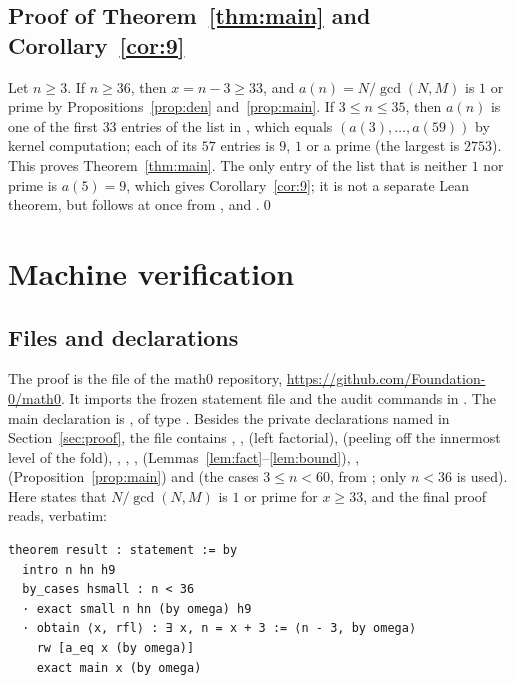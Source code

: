 \documentclass[11pt]{amsart}
\theoremstyle{plain}
\theoremstyle{definition}
\begin{document}
\subsection{Proof of Theorem~\ref{thm:main} and Corollary~\ref{cor:9}}
Let $n\ge3$. If $n\ge36$, then $x=n-3\ge33$, and $a(n)=N/\gcd(N,M)$ is $1$ or prime by Propositions~\ref{prop:den} and~\ref{prop:main}. If $3\le n\le35$, then $a(n)$ is one of the first $33$ entries of the list in , which equals $(a(3),\dots,a(59))$ by kernel computation; each of its $57$ entries is $9$, $1$ or a prime (the largest is $2753$). This proves Theorem~\ref{thm:main}. The only entry of the list that is neither $1$ nor prime is $a(5)=9$, which gives Corollary~\ref{cor:9}; it is not a separate Lean theorem, but follows at once from ,  and .\qed

\section{Machine verification}\label{sec:lean}

\subsection*{Files and declarations}
The proof is the file  of the math0 repository, \url{https://github.com/Foundation-0/math0}. It imports the frozen statement file and the audit commands in . The main declaration is , of type . Besides the private declarations named in Section~\ref{sec:proof}, the file contains , ,  (left factorial),  (peeling off the innermost level of the fold), , , ,  (Lemmas~\ref{lem:fact}--\ref{lem:bound}), ,  (Proposition~\ref{prop:main}) and  (the cases $3\le n<60$, from ; only $n<36$ is used). Here  states that $N/\gcd(N,M)$ is $1$ or prime for $x\ge33$, and the final proof reads, verbatim:
\begin{lstlisting}
theorem result : statement := by
  intro n hn h9
  by_cases hsmall : n < 36
  · exact small n hn (by omega) h9
  · obtain ⟨x, rfl⟩ : ∃ x, n = x + 3 := ⟨n - 3, by omega⟩
    rw [a_eq x (by omega)]
    exact main x (by omega)
\end{lstlisting}
\end{document}
